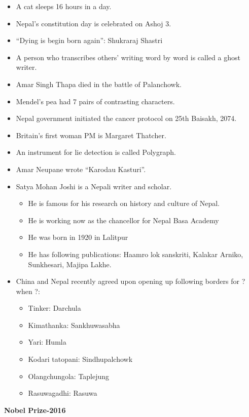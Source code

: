 \documentclass[
  openany]{book}
\providecommand{\tightlist}{%
  \setlength{\itemsep}{0pt}\setlength{\parskip}{0pt}}
\begin{document}
\begin{itemize}
\item
  A cat sleeps 16 hours in a day.
\item
  Nepal's constitution day is celebrated on Ashoj 3.
\item
  ``Dying is begin born again'': Shukraraj Shastri
\item
  A person who transcribes others' writing word by word is called a ghost writer.
\item
  Amar Singh Thapa died in the battle of Palanchowk.
\item
  Mendel's pea had 7 pairs of contrasting characters.
\item
  Nepal government initiated the cancer protocol on 25th Baisakh, 2074.
\item
  Britain's first woman PM is Margaret Thatcher.
\item
  An instrument for lie detection is called Polygraph.
\item
  Amar Neupane wrote ``Karodau Kasturi''.
\item
  Satya Mohan Joshi is a Nepali writer and scholar.

  \begin{itemize}
  \tightlist
  \item
    He is famous for his research on history and culture of Nepal.
  \item
    He is working now as the chancellor for Nepal Basa Academy
  \item
    He was born in 1920 in Lalitpur
  \item
    He has following publications: Haamro lok sanskriti, Kalakar Arniko, Sunkhesari, Majipa Lakhe.
  \end{itemize}
\item
  China and Nepal recently agreed upon opening up following borders for ? when ?:

  \begin{itemize}
  \tightlist
  \item
    Tinker: Darchula
  \item
    Kimathanka: Sankhuwasabha
  \item
    Yari: Humla
  \item
    Kodari tatopani: Sindhupalchowk
  \item
    Olangchungola: Taplejung
  \item
    Rasuwagadhi: Rasuwa
  \end{itemize}
\end{itemize}

\textbf{Nobel Prize-2016}
\end{document}
